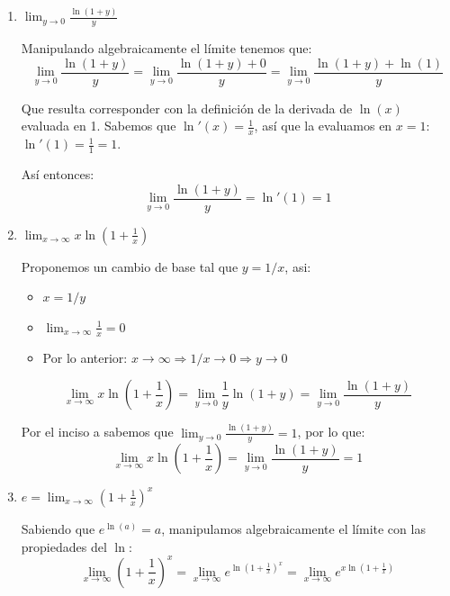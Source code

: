 \documentclass[12pt]{article}
\begin{document}
\begin{enumerate}[\hspace{9px} a)]
    \item \(\displaystyle\lim_{y \to 0}\frac{\ln(1+y)}{y}\)\bigskip
    
    Manipulando algebraicamente el l\'imite tenemos que:
    \begin{equation*}
        \lim_{y \to 0}\frac{\ln(1+y)}{y} = \lim_{y \to 0}\frac{\ln(1+y)+0}{y} = \lim_{y \to 0}\frac{\ln(1+y)+\ln(1)}{y}
    \end{equation*}

    Que resulta corresponder con la definici\'on de la derivada de \(\ln(x)\) evaluada en 1. Sabemos que \(\ln'(x)=\displaystyle\frac{1}{x}\), as\'i que la evaluamos en \(x=1\): \(\ln'(1)=\displaystyle\frac{1}{1}=1\). \medskip

    As\'i entonces: \[\lim_{y \to 0}\frac{\ln(1+y)}{y} = \ln'(1) = 1\]

    \item \(\displaystyle\lim_{x \to \infty}x\ln\left(1+\frac{1}{x}\right)\)\bigskip
    
    Proponemos un cambio de base tal que \(y = 1/x\), asi:

    \begin{itemize}
        \item \(x = 1/y\)
        \item \(\displaystyle\lim_{x \to \infty}\frac{1}{x} = 0\)
        \item Por lo anterior: \(x\to\infty \Rightarrow 1/x\to0 \Rightarrow y\to0\)
    \end{itemize}

    \[\lim_{x \to \infty}x\ln\left(1+\frac{1}{x}\right) = \lim_{y\to0}\frac{1}{y}\ln\left(1+y\right) = \lim_{y\to0}\frac{\ln(1+y)}{y}\]

    Por el inciso a sabemos que \(\displaystyle\lim_{y \to 0}\frac{\ln(1+y)}{y}=1\), por lo que:
    \[\lim_{x \to \infty}x\ln\left(1+\frac{1}{x}\right) = \lim_{y\to0}\frac{\ln(1+y)}{y} = 1\]

    \item \(e=\displaystyle\lim_{x \to \infty}\left(1+\frac{1}{x}\right)^x\)\bigskip
    
        Sabiendo que \(e^{\ln(a)}=a\), manipulamos algebraicamente el l\'imite con las propiedades del \(\ln\):
        \begin{equation*}
            \lim_{x \to \infty}\left(1+\frac{1}{x}\right)^x = \lim_{x \to \infty}e^{\displaystyle\ln\left(1+\frac{1}{x}\right)^x} = \lim_{x \to \infty}e^{\displaystyle x\ln\left(1+\frac{1}{x}\right)}
        \end{equation*}


\end{enumerate}
\end{document}
